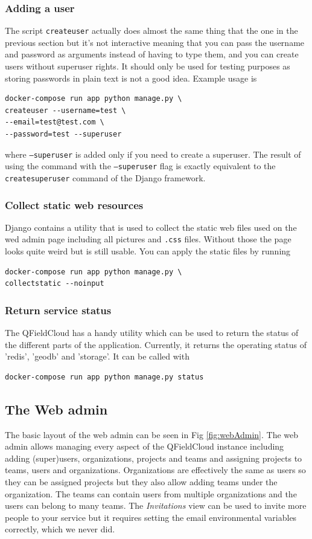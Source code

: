 \documentclass{article}
\begin{document}
\subsubsection{Adding a user}
The script \texttt{createuser} actually does almost the same thing that the one in the previous section but it's not interactive meaning that you can pass the username and password as arguments instead of having to type them, and you can create users without superuser rights. It should only be used for testing purposes as storing passwords in plain text is not a good idea. Example usage is
\begin{verbatim}
docker-compose run app python manage.py \ 
createuser --username=test \ 
--email=test@test.com \
--password=test --superuser
\end{verbatim}
where \texttt{--superuser} is added only if you need to create a superuser. The result of using the command with the \texttt{--superuser} flag is exactly equivalent to the \texttt{createsuperuser} command of the Django framework.

\subsubsection{Collect static web resources}
Django contains a utility that is used to collect the static web files used on the wed admin page including all pictures and \texttt{.css} files. Without those the page looks quite weird but is still usable. You can apply the static files by running
\begin{verbatim}
docker-compose run app python manage.py \ 
collectstatic --noinput
\end{verbatim}

\subsubsection{Return service status}
The QFieldCloud has a handy utility which can be used to return the status of the different parts of the application. Currently, it returns the operating status of 'redis', 'geodb' and 'storage'. It can be called with
\begin{verbatim}
docker-compose run app python manage.py status
\end{verbatim}

\subsection{The Web admin}
The basic layout of the web admin can be seen in Fig \ref{fig:webAdmin}. The web admin allows managing every aspect of the QFieldCloud instance including adding (super)users, organizations, projects and teams and assigning projects to teams, users and organizations. Organizations are effectively the same as users so they can be assigned projects but they also allow adding teams under the organization. The teams can contain users from multiple organizations and the users can belong to many teams. The \emph{Invitations} view can be used to invite more people to your service but it requires setting the email environmental variables correctly, which we never did.
\end{document}
